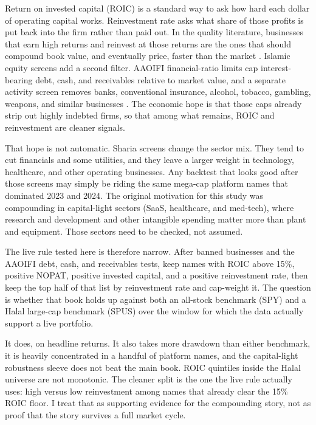 \documentclass[11pt,letterpaper]{article}
\begin{document}
Return on invested capital (ROIC) is a standard way to ask how hard each dollar of operating capital works. Reinvestment rate asks what share of those profits is put back into the firm rather than paid out. In the quality literature, businesses that earn high returns and reinvest at those returns are the ones that should compound book value, and eventually price, faster than the market \citep{damodaran2007,novymarx2013,asness2019}. Islamic equity screens add a second filter. AAOIFI financial-ratio limits cap interest-bearing debt, cash, and receivables relative to market value, and a separate activity screen removes banks, conventional insurance, alcohol, tobacco, gambling, weapons, and similar businesses \citep{aaoifi21}. The economic hope is that those caps already strip out highly indebted firms, so that among what remains, ROIC and reinvestment are cleaner signals.

That hope is not automatic. Sharia screens change the sector mix. They tend to cut financials and some utilities, and they leave a larger weight in technology, healthcare, and other operating businesses. Any backtest that looks good after those screens may simply be riding the same mega-cap platform names that dominated 2023 and 2024. The original motivation for this study was compounding in capital-light sectors (SaaS, healthcare, and med-tech), where research and development and other intangible spending matter more than plant and equipment. Those sectors need to be checked, not assumed.

The live rule tested here is therefore narrow. After banned businesses and the AAOIFI debt, cash, and receivables tests, keep names with ROIC above 15\%, positive NOPAT, positive invested capital, and a positive reinvestment rate, then keep the top half of that list by reinvestment rate and cap-weight it. The question is whether that book holds up against both an all-stock benchmark (SPY) and a Halal large-cap benchmark (SPUS) over the window for which the data actually support a live portfolio.

It does, on headline returns. It also takes more drawdown than either benchmark, it is heavily concentrated in a handful of platform names, and the capital-light robustness sleeve does not beat the main book. ROIC quintiles inside the Halal universe are not monotonic. The cleaner split is the one the live rule actually uses: high versus low reinvestment among names that already clear the 15\% ROIC floor. I treat that as supporting evidence for the compounding story, not as proof that the story survives a full market cycle.
\end{document}
